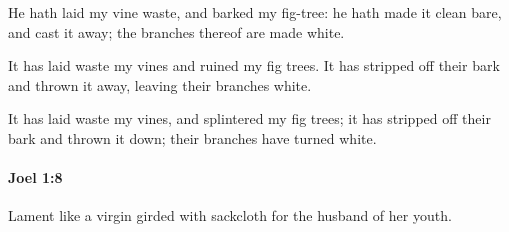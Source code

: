 			\begin{versebox}
					\item[BHS] 
					\item[LXX] 
					\item[ASV] He hath laid my vine waste, and barked my fig-tree: he hath made it clean bare, and cast it away; the branches thereof are made white.
					\item[NIV] It has laid waste my vines and ruined my fig trees. It has stripped off their bark and thrown it away, leaving their branches white.
					\item[NRSV] It has laid waste my vines, and splintered my fig trees; it has stripped off their bark and thrown it down; their branches have turned white.
			\end{versebox}

		\paragraph{Joel 1:8} %
			\label{JOEL-1-8}

			Lament like a virgin girded with sackcloth for the husband of her youth.

